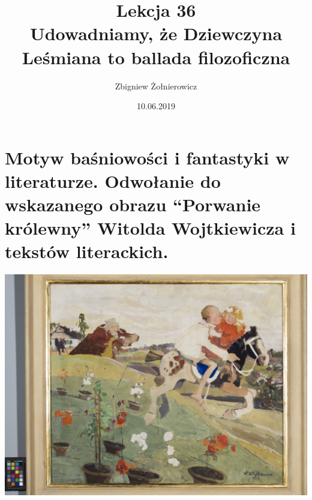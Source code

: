 \documentclass{article}
\begin{document}
\title{
        {\huge Lekcja 36} \\
        {\large Udowadniamy, że Dziewczyna Leśmiana to ballada filozoficzna}
}
\author{Zbigniew Żołnierowicz}
\date{10.06.2019}
\maketitle
\section{Motyw baśniowości i fantastyki w literaturze. Odwołanie do wskazanego obrazu ``Porwanie królewny'' Witolda Wojtkiewicza i tekstów literackich.}
\includegraphics[width=\textwidth]{porwaniekrolewny.jpg}
\end{document}
